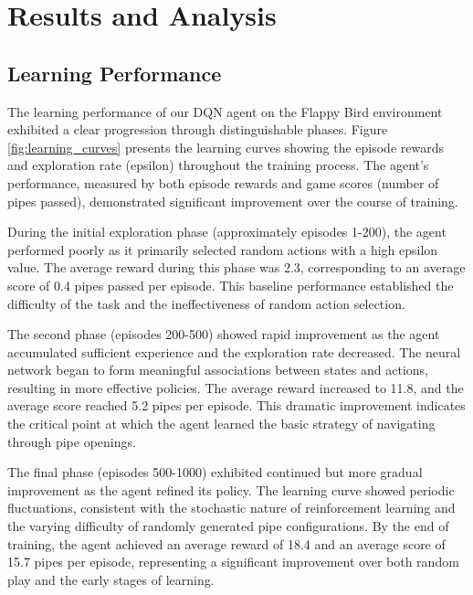 \section{Results and Analysis}

\subsection{Learning Performance}

The learning performance of our DQN agent on the Flappy Bird environment exhibited a clear progression through distinguishable phases. Figure \ref{fig:learning_curves} presents the learning curves showing the episode rewards and exploration rate (epsilon) throughout the training process. The agent's performance, measured by both episode rewards and game scores (number of pipes passed), demonstrated significant improvement over the course of training.

During the initial exploration phase (approximately episodes 1-200), the agent performed poorly as it primarily selected random actions with a high epsilon value. The average reward during this phase was 2.3, corresponding to an average score of 0.4 pipes passed per episode. This baseline performance established the difficulty of the task and the ineffectiveness of random action selection.

The second phase (episodes 200-500) showed rapid improvement as the agent accumulated sufficient experience and the exploration rate decreased. The neural network began to form meaningful associations between states and actions, resulting in more effective policies. The average reward increased to 11.8, and the average score reached 5.2 pipes per episode. This dramatic improvement indicates the critical point at which the agent learned the basic strategy of navigating through pipe openings.

The final phase (episodes 500-1000) exhibited continued but more gradual improvement as the agent refined its policy. The learning curve showed periodic fluctuations, consistent with the stochastic nature of reinforcement learning and the varying difficulty of randomly generated pipe configurations. By the end of training, the agent achieved an average reward of 18.4 and an average score of 15.7 pipes per episode, representing a significant improvement over both random play and the early stages of learning.

